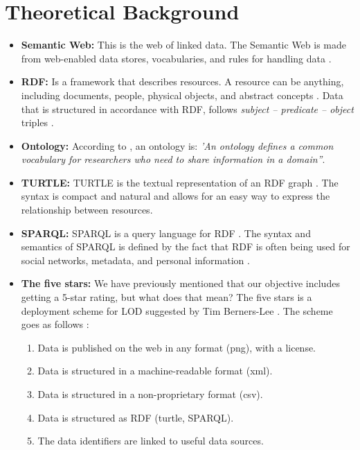 \chapter{Theoretical Background}

\begin{itemize}
\item \textbf{Semantic Web:} This is the web of linked data. The Semantic Web is made from web-enabled data stores, vocabularies, and rules for handling data \cite{semantic}.

\item \textbf{RDF:} Is a framework that describes resources. A resource can be anything, including documents, people, physical objects, and abstract concepts \cite{rdf}. Data that is structured in accordance with RDF, follows \textit{subject – predicate – object} triples \cite{rdf}.

\item \textbf{Ontology:} According to \cite{ontology}, an ontology is: \textit{'An ontology defines a common vocabulary for researchers who need to share information in a domain''}.

\item \textbf{TURTLE:} TURTLE is the textual representation of an RDF graph \cite{turtle}. The syntax is compact and natural and allows for an easy way to express the relationship between resources.

\item \textbf{SPARQL:} SPARQL is a query language for RDF \cite{sparql}. The syntax and semantics of SPARQL is defined by the fact that RDF is often being used for social networks, metadata, and personal information \cite{sparql}.

\item \textbf{The five stars:} We have previously mentioned that our objective includes getting a 5-star rating, but what does that mean? The five stars is a deployment scheme for LOD suggested by Tim Berners-Lee \cite{lod}. The scheme goes as follows \cite{lod}:

	\begin{enumerate}
	\item Data is published on the web in any format (png), with a license.
	\item Data is structured in a machine-readable format (xml).
	\item Data is structured in a non-proprietary format (csv).
	\item Data is structured as RDF (turtle, SPARQL).
	\item The data identifiers are linked to useful data sources.
	\end{enumerate}

\end{itemize}

